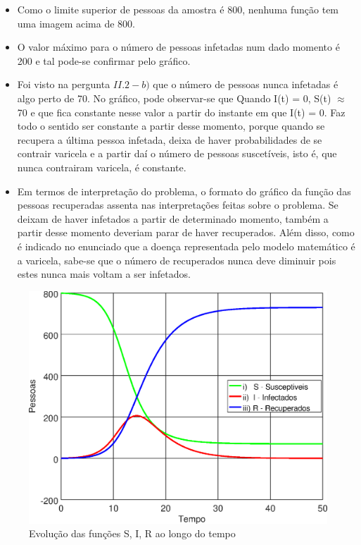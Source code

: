 \documentclass[portuguese, a4paper]{article}
\begin{document}
		
		\begin{itemize}
		\item Como o limite superior de pessoas da amostra é 800, nenhuma função tem uma imagem acima de 800.
		\item O valor máximo para o número de pessoas infetadas num dado momento é 200 e tal pode-se confirmar pelo gráfico.
		\item Foi visto na pergunta $II.2-b)$ que o número de pessoas nunca infetadas é algo perto de 70. %
		No gráfico, pode observar-se que Quando I(t) = 0, S(t) $\approx$ 70 e que fica constante nesse valor a partir do instante em que I(t) = 0.
		Faz todo o sentido ser constante a partir desse momento, porque quando se recupera a última pessoa infetada, deixa de haver probabilidades
		de se contrair varicela e a partir daí o número de pessoas suscetíveis, isto é, que nunca contrairam varicela, é constante.
		\item Em termos de interpretação do problema, o formato do gráfico da função das pessoas recuperadas assenta nas interpretações
		feitas sobre o problema. Se deixam de haver infetados a partir de determinado momento, 
		também a partir desse momento deveriam parar de haver recuperados.
		Além disso, como é indicado no enunciado que a doença representada pelo modelo matemático é a varicela, sabe-se que o número de recuperados nunca deve diminuir pois estes nunca mais voltam a ser infetados.
		\end{itemize}
		
		\begin{figure}[H]
			\centering
			\includegraphics[width=0.80\linewidth]{IIIc_fitted}
			\captionsetup{width=0.80\linewidth}
			\caption{Evolução das funções S, I, R ao longo do tempo}
		\end{figure}
\end{document}
